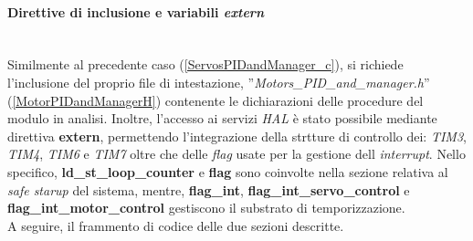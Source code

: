 \paragraph{Direttive di inclusione e variabili \textit{extern}}\mbox{}\\
Similmente al precedente caso (\ref{ServosPIDandManager_c}), si richiede l'inclusione del proprio file di intestazione, ''\textit{Motors\_PID\_and\_manager.h}'' (\ref{MotorPIDandManagerH}) contenente le dichiarazioni delle procedure del modulo in analisi.
Inoltre, l'accesso ai servizi \textit{HAL} è stato possibile mediante direttiva \textbf{extern}, permettendo l'integrazione della strtture di controllo dei: \textit{TIM3}, \textit{TIM4}, \textit{TIM6} e \textit{TIM7} oltre che delle \textit{flag} usate per la gestione dell \textit{interrupt}.
Nello specifico, \textbf{ld\_st\_loop\_counter} e \textbf{flag} sono coinvolte nella sezione relativa al \textit{safe starup} del sistema, mentre, \textbf{flag\_int}, \textbf{flag\_int\_servo\_control} e \textbf{flag\_int\_motor\_control} gestiscono il substrato di temporizzazione.\\
A seguire, il frammento di codice delle due sezioni descritte.


